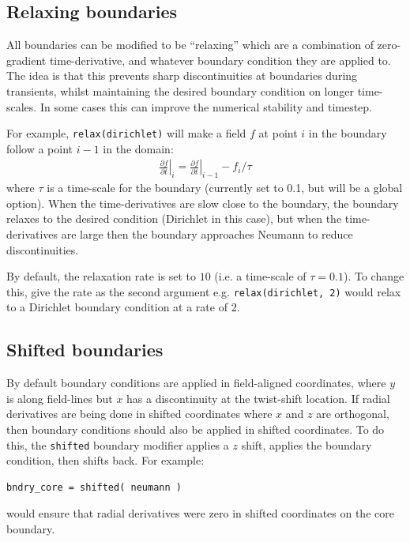 \documentclass[12pt]{article}
\newcommand{\code}[1]{\texttt{#1}}
\newcommand{\deriv}[2]{\ensuremath{\frac{\partial #1}{\partial #2}}}
\begin{document}
\subsection{Relaxing boundaries}
%
All boundaries can be modified to be ``relaxing'' which are a combination of
zero-gradient time-derivative, and whatever boundary condition they are applied
to. The idea is that this prevents sharp discontinuities at boundaries during
transients, whilst maintaining the desired boundary condition on longer
time-scales. In some cases this can improve the numerical stability and
timestep.

For example, \code{relax(dirichlet)} will make a field $f$ at point $i$ in the
boundary follow a point $i-1$ in the domain:
%
\begin{align}
\left.\deriv{f}{t}\right|_i = \left.\deriv{f}{t}\right|_{i-1}  - f_i / \tau
\end{align}
%
where $\tau$ is a time-scale for the boundary (currently set to 0.1, but will
be a global option).  When the time-derivatives are slow close to the boundary,
the boundary relaxes to the desired condition (Dirichlet in this case), but
when the time-derivatives are large then the boundary approaches Neumann to
reduce discontinuities.

By default, the relaxation rate is set to $10$ (i.e. a time-scale of
$\tau=0.1$).  To change this, give the rate as the second argument e.g.
\code{relax(dirichlet, 2)} would relax to a Dirichlet boundary condition at a
rate of $2$.



\subsection{Shifted boundaries}
%
By default boundary conditions are applied in field-aligned coordinates, where
$y$ is along field-lines but $x$ has a discontinuity at the twist-shift
location. If radial derivatives are being done in shifted coordinates where $x$
and $z$ are orthogonal, then boundary conditions should also be applied in
shifted coordinates. To do this, the \code{shifted} boundary modifier applies a
$z$ shift, applies the boundary condition, then shifts back. For example:
%
\begin{lstlisting}[numbers=none]
bndry_core = shifted( neumann )
\end{lstlisting}
%
would ensure that radial derivatives were zero in shifted coordinates on the
core boundary.
\end{document}
